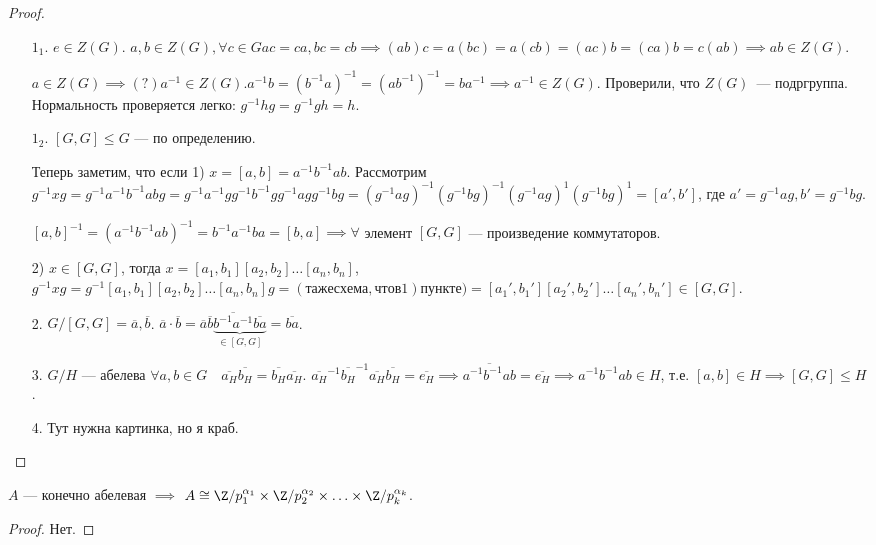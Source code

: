 \begin{proof}
    \begin{enumerate}
        \item[$1_1$.] $e \in Z(G)$.  $a, b \in Z(G), \forall c \in G ac = ca, bc = cb \implies (ab)c = a(bc) = a(cb) = (ac)b = (ca)b = c(ab) \implies ab \in Z(G)$.

            $a \in Z(G) \implies(?) a^{-1} \in Z(G). a^{-1}b = (b^{-1}a)^{-1} = (ab^{-1})^{-1} = ba^{-1} \implies a^{-1} \in Z(G)$. Проверили, что $Z(G)$~--- подргруппа. Нормальность проверяется легко: $g^{-1}hg = g^{-1}gh = h$.
        \item[$1_2$.] $[G, G] \le G$ --- по определению.

            Теперь заметим, что если 1) $x = [a, b] = a^{-1}b^{-1}ab$. Рассмотрим  $g^{-1}xg = g^{-1}a^{-1}b^{-1}abg = g^{-1}a^{-1}gg^{-1}b^{-1}gg^{-1}agg^{-1}bg = (g^{-1}ag)^{-1}(g^{-1}bg)^{-1}(g^{-1}ag)^{1}(g^{-1}bg)^{1} = [a', b']$, где $a' = g^{-1}ag, b' = g^{-1}bg$.

            $[a, b]^{-1} = (a^{-1}b^{-1}ab)^{-1} = b^{-1}a^{-1}ba = [b, a] \implies \forall $ элемент  $[G, G]$ --- произведение коммутаторов.

             2) $x \in [G, G]$, тогда  $x = [a_1, b_1][a_2,b_2]\ldots[a_n, b_n]$, $g^{-1}xg = g^{-1}[a_1, b_1][a_2, b_2]\ldots[a_n, b_n]g = (та же схема, что в 1) пункте) = [a_1', b_1'][a_2', b_2']\ldots[a_n', b_n'] \in [G, G]$.
         \item[2.] $G / [G, G] = \overline{a}, \overline{b}$.  $\overline{a} \cdot \overline{b} = \overline{a}\overline{b}\underbrace{\overline{b^{-1}a^{-1}}\overline{ba}}_{\in [G, G]} = \overline{ba}$.
         \item[3.] $G / H$ --- абелева  $\forall a, b \in G\quad \overline{a_H} \overline{b_H} = \overline{b_H}\overline{a_H}$.  $\overline{a_H}^{-1}\overline{b_H}^{-1} \overline{a_H}\overline{b_H} = \overline{e_H} \implies \overline{a^{-1} b^{-1}ab} = \overline{e_H} \implies a^{-1}b^{-1}ab \in H$, т.е. $[a, b] \in H \implies [G, G] \le H$.
         \item[4.] Тут нужна картинка, но я краб.
    \end{enumerate}
\end{proof}
\begin{theorem}
    $A$ --- конечно абелевая  $\implies$  $A \cong \Z / p_1^{\alpha_1} \times \Z / p_2^{\alpha_2} \times \ldots \times \Z / p_k^{\alpha_k}$.
\end{theorem}
\begin{proof}
    Нет.
\end{proof}
